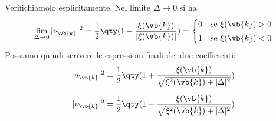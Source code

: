 Verifichiamolo esplicitamente. Nel limite $\Delta \to 0$ si ha
\begin{equation*}
   \lim_{\Delta \to 0} |\nu_{\vb{k}}|^2
   =\frac{1}{2} \qty( 1 - \frac{\xi(\vb{k})}{|\xi(\vb{k})|} )
   =\begin{cases}
      0 & \text{se } \xi(\vb{k})>0
      \\[0.1cm]
      1 & \text{se } \xi(\vb{k})<0
   \end{cases}
\end{equation*}
Possiamo quindi scrivere le espressioni finali dei due coefficienti:
\begin{align}
   |u_{\vb{k}}|^2
   &= \frac{1}{2} \qty(1 + \frac{\xi(\vb{k})}{\sqrt{\xi^2(\vb{k}) + |\Delta|^2}})
   \label{eq:coefficiente_u_BCS}
   \\[0.2cm]
   |\nu_{\vb{k}}|^2
   &= \frac{1}{2} \qty(1 - \frac{\xi(\vb{k})}{\sqrt{\xi^2(\vb{k}) + |\Delta|^2}})
   \label{eq:coefficiente_nu_BCS}
\end{align}

